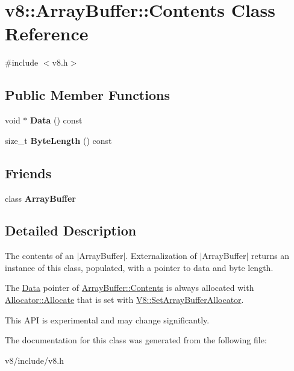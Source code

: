 \hypertarget{classv8_1_1ArrayBuffer_1_1Contents}{}\section{v8\+:\+:Array\+Buffer\+:\+:Contents Class Reference}
\label{classv8_1_1ArrayBuffer_1_1Contents}


{\ttfamily \#include $<$v8.\+h$>$}

\subsection*{Public Member Functions}
\begin{DoxyCompactItemize}
\item 
\hypertarget{classv8_1_1ArrayBuffer_1_1Contents_a9ed7556bfaca7a0b24deb05538a76dcd}{}void $\ast$ {\bfseries Data} () const \label{classv8_1_1ArrayBuffer_1_1Contents_a9ed7556bfaca7a0b24deb05538a76dcd}

\item 
\hypertarget{classv8_1_1ArrayBuffer_1_1Contents_a1b6a3eecb4fe05f4d33c83b6bc1fa737}{}size\+\_\+t {\bfseries Byte\+Length} () const \label{classv8_1_1ArrayBuffer_1_1Contents_a1b6a3eecb4fe05f4d33c83b6bc1fa737}

\end{DoxyCompactItemize}
\subsection*{Friends}
\begin{DoxyCompactItemize}
\item 
\hypertarget{classv8_1_1ArrayBuffer_1_1Contents_acbcb25033a90500a51aa19c811b2a1d3}{}class {\bfseries Array\+Buffer}\label{classv8_1_1ArrayBuffer_1_1Contents_acbcb25033a90500a51aa19c811b2a1d3}

\end{DoxyCompactItemize}


\subsection{Detailed Description}
The contents of an $\vert$\+Array\+Buffer$\vert$. Externalization of $\vert$\+Array\+Buffer$\vert$ returns an instance of this class, populated, with a pointer to data and byte length.

The \hyperlink{classv8_1_1Data}{Data} pointer of \hyperlink{classv8_1_1ArrayBuffer_1_1Contents}{Array\+Buffer\+::\+Contents} is always allocated with \hyperlink{classv8_1_1ArrayBuffer_1_1Allocator_a106b0d80120ed04fe9b9675e96f0340b}{Allocator\+::\+Allocate} that is set with \hyperlink{classv8_1_1V8_abc40950a39f8cb6946dc8a1ad41eea84}{V8\+::\+Set\+Array\+Buffer\+Allocator}.

This A\+P\+I is experimental and may change significantly. 

The documentation for this class was generated from the following file\+:\begin{DoxyCompactItemize}
\item 
v8/include/v8.\+h\end{DoxyCompactItemize}
